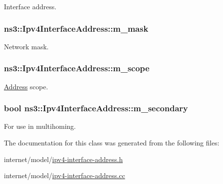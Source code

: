 Interface address. 

\subsubsection[{\texorpdfstring{m\+\_\+mask}{m_mask}}]{ ns3\+::\+Ipv4\+Interface\+Address\+::m\+\_\+mask\hspace{0.3cm}{\ttfamily [private]}}\hypertarget{classns3_1_1Ipv4InterfaceAddress_a5154032ec6a8e3257a6b2ba48993767d}{}\label{classns3_1_1Ipv4InterfaceAddress_a5154032ec6a8e3257a6b2ba48993767d}


Network mask. 

\subsubsection[{\texorpdfstring{m\+\_\+scope}{m_scope}}]{ ns3\+::\+Ipv4\+Interface\+Address\+::m\+\_\+scope\hspace{0.3cm}{\ttfamily [private]}}\hypertarget{classns3_1_1Ipv4InterfaceAddress_aaed017930f52bd9110673078a72e480d}{}\label{classns3_1_1Ipv4InterfaceAddress_aaed017930f52bd9110673078a72e480d}


\hyperlink{classns3_1_1Address}{Address} scope. 

\subsubsection[{\texorpdfstring{m\+\_\+secondary}{m_secondary}}]{\setlength{\rightskip}{0pt plus 5cm}bool ns3\+::\+Ipv4\+Interface\+Address\+::m\+\_\+secondary\hspace{0.3cm}{\ttfamily [private]}}\hypertarget{classns3_1_1Ipv4InterfaceAddress_a4c84fd58f6c2f35f79202bb4163cdfe3}{}\label{classns3_1_1Ipv4InterfaceAddress_a4c84fd58f6c2f35f79202bb4163cdfe3}


For use in multihoming. 



The documentation for this class was generated from the following files\+:\begin{DoxyCompactItemize}
\item 
internet/model/\hyperlink{ipv4-interface-address_8h}{ipv4-\/interface-\/address.\+h}\item 
internet/model/\hyperlink{ipv4-interface-address_8cc}{ipv4-\/interface-\/address.\+cc}\end{DoxyCompactItemize}
